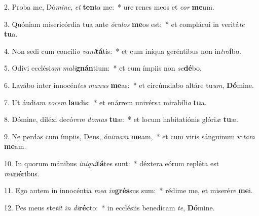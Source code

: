 2. Proba me, Dó\textit{mi}\textit{ne}, \textit{et} \textbf{ten}ta me:~*  ure renes meos et \textit{cor} \textbf{me}um.\

3. Quóniam misericórdia tua ante \textit{ó}\textit{cu}\textit{los} \textbf{me}os est:~*  et complácui in veritá\textit{te} \textbf{tu}a.\

4. Non sedi cum concíli\textit{o} \textit{va}\textit{ni}\textbf{tá}tis:~*  et cum iníqua geréntibus non in\textit{tro}\textbf{í}bo.\

5. Odívi ecclési\textit{am} \textit{ma}\textit{li}\textbf{gnán}tium:~*  et cum ímpiis non \textit{se}\textbf{dé}bo.\

6. Lavábo inter innocén\textit{tes} \textit{ma}\textit{nus} \textbf{me}as:~*  et circúmdabo altáre tu\textit{um}, \textbf{Dó}mine.\

7. Ut áudi\textit{am} \textit{vo}\textit{cem} \textbf{lau}dis:~*  et enárrem univérsa mirabíli\textit{a} \textbf{tu}a.\

8. Dómine, diléxi decó\textit{rem} \textit{do}\textit{mus} \textbf{tu}æ:~*  et locum habitatiónis glóri\textit{æ} \textbf{tu}æ.\

9. Ne perdas cum ímpiis, Deus, \textit{á}\textit{ni}\textit{mam} \textbf{me}am,~*  et cum viris sánguinum vi\textit{tam} \textbf{me}am.\

10. In quorum mánibus \textit{in}\textit{i}\textit{qui}\textbf{tá}tes sunt:~*  déxtera eórum repléta est \textit{mu}\textbf{né}ribus.\

11. Ego autem in innocéntia \textit{me}\textit{a} \textit{in}\textbf{grés}sus sum:~*  rédime me, et miseré\textit{re} \textbf{me}i.\

12. Pes meus ste\textit{tit} \textit{in} \textit{di}\textbf{réc}to:~*  in ecclésiis benedícam \textit{te}, \textbf{Dó}mine.\

